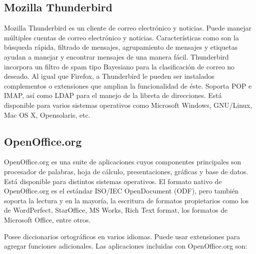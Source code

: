 \subsection{Mozilla Thunderbird}
\label{sec:thunderbird}

Mozilla Thunderbird es un cliente de correo electrónico y noticias. Puede manejar múltiples cuentas de correo electrónico y noticias. Características como son la búsqueda rápida, filtrado de mensajes, agrupamiento de mensajes y etiquetas ayudan a manejar y encontrar mensajes de una manera fácil. Thunderbird incorpora un filtro de spam tipo Bayesiano para la clasificación de correo no deseado. Al igual que Firefox, a Thunderbird le pueden ser instalados complementos o extensiones que amplian la funcionalidad de éste. Soporta POP e IMAP, así como LDAP para el manejo de la libreta de direcciones. Está disponible para varios sistemas operativos como Microsoft Windows, GNU/Linux, Mac OS X, Opensolaris, etc.

\subsection{OpenOffice.org}
\label{sec:openoffice}

OpenOffice.org es una suite de aplicaciones cuyos componentes principales son procesador de palabras, hoja de cálculo, presentaciones, gráficas y base de datos. Está disponible para distintos sistemas operativos. El formato nativo de OpenOffice.org es el estándar ISO/IEC OpenDocument (ODF), pero también soporta la lectura y en la mayoría, la escritura de formatos propietarios como los de WordPerfect, StarOffice, MS Works, Rich Text format, los formatos de Microsoft Office, entre otros.

Posee diccionarios ortográficos en varios idiomas. Puede usar extensiones para agregar funciones adicionales. Las aplicaciones incluidas con OpenOffice.org son:

